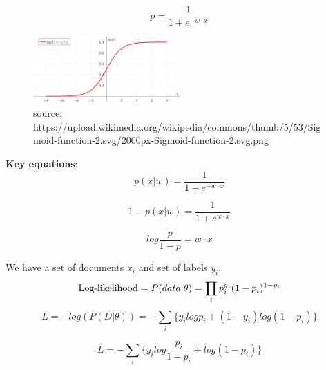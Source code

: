        \begin{equation}
       p=\frac{1}{1+e^{-w \cdot x}}
       	\end{equation}  
   
   \begin{figure}[ht]
   	\begin{center}
   		\includegraphics[width=0.5\textwidth]{figures/Sigmoid.png}
   		\caption{
   			source: https://upload.wikimedia.org/wikipedia/commons/thumb/5/53/Sigmoid-function-2.svg/2000px-Sigmoid-function-2.svg.png}
   		\label{fig:example_figure}
   	\end{center}
   \end{figure}
   
   \textbf{Key equations}:
       \begin{equation}
       p(x|w)=\frac{1}{1+e^{-w \cdot x}}
       \end{equation} 
  
       \begin{equation}
       1-p(x|w)=\frac{1}{1+e^{w \cdot x}}
       \end{equation} 
        
        \begin{equation}
        log\frac{p}{1-p} = w \cdot x
        \end{equation} 
        
        
         
        
  We have a set of documents $x_{i}$ and set of labels $y_{i}$.\\
  
    \begin{equation}
    \textnormal{Log-likelihood}=P(data|\theta)=\prod_{i}{ p_{i}^{y_{i}}(1-p_{i})^{1-y_{i}}}
    \end{equation}
    \begin{equation}
    L=-log(P(D|\theta))=-\sum\limits_{i}\{
    y_{i}logp_{i} +  (1-y_{i})log(1-p_{i})
    \}
    \end{equation}
    
    \begin{equation}
    L=-\sum\limits_{i}\{
    y_{i}log\frac{p_{i}}{{1-p_{i}}} + log(1-p_{i})
    \}
    \end{equation}
    
